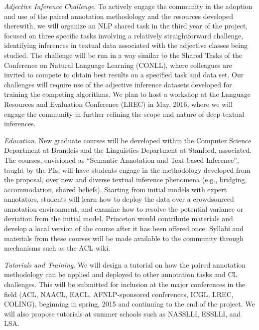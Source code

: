 \documentclass[10pt]{article}
\begin{document}
{\it Adjective Inference Challenge}. To actively engage the community in the adoption and  use of the paired annotation methodology and the resources developed therewith, we will organize an  NLP shared task in the third year of the project,  focused on three specific tasks involving a relatively straightforward challenge,  identifying inferences in textual data associated with the adjective classes being studied. 
The challenge will be run in a way similar to the Shared Tasks of the Conference on Natural Language Learning (CONLL), where colleagues are invited to compete to obtain best results on a specified task and data set. Our challenges will require use of the adjective inference datasets developed for training the competing algorithms.  We plan to host a workshop at the Language Resources and Evaluation Conference (LREC) in May, 2016, where we will engage the community in further refining the scope and nature of deep textual inferences.

{\it Education}. New graduate courses will be developed within the Computer Science Department at Brandeis and  the Linguistics Department at Stanford, associated. The courses, envisioned as  ``Semantic Annotation and Text-based Inference'', taught by the PIs, will have students engage in the methodology developed from the proposal, over new and diverse textual inference phenomena (e.g., bridging, accommodation, shared beliefs). Starting from initial models with expert annotators, students will learn how to deploy the data over a crowdsourced  annotation environment, and examine how to resolve the potential variance or deviation from the initial model. Princeton would contribute materials and  develop a local version of the course after it has been 
offered  once.
Syllabi and materials from these courses will be made available to the community through mechanisms such as the ACL wiki.
 
{\it Tutorials and Training}.
We will design a tutorial on how the paired annotation methodology can be applied and deployed to other annotation tasks and CL challenges. This will be submitted for inclusion at the major conferences in the field (ACL, NAACL, EACL, AFNLP-sponsored conferences, ICGL, LREC, COLING), beginning in spring, 2015 and continuing to the end of the project. We will also propose tutorials at summer schools such as NASSLLI, ESSLLI, and LSA. 
\end{document}
